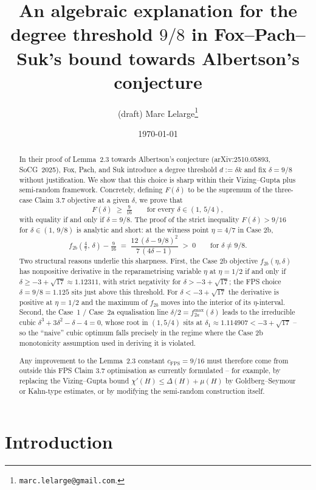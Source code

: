 \documentclass[11pt,a4paper]{article}
\title{An algebraic explanation for the degree threshold
       $9/8$ in Fox--Pach--Suk's bound towards Albertson's conjecture}
\author{(draft) Marc Lelarge\thanks{\texttt{marc.lelarge@gmail.com}.}}
\date{\today}
\theoremstyle{definition}
\newcommand{\cFPS}{c_{\mathrm{FPS}}}
\newcommand{\chip}{\chi'}
\begin{document}
\maketitle

\begin{abstract}
In their proof of Lemma~2.3 towards Albertson's conjecture
(arXiv:2510.05893, SoCG~2025), Fox, Pach, and Suk introduce a
degree threshold $d := \delta k$ and fix $\delta = 9/8$ without
justification. We show that this choice is sharp within their
Vizing--Gupta plus semi-random framework. Concretely, defining
$F(\delta)$ to be the supremum of the three-case Claim 3.7
objective at a given $\delta$, we prove that
\[
   F(\delta) \;\ge\; \tfrac{9}{16}
   \qquad\text{for every }\delta\in(1,\,5/4),
\]
with equality if and only if $\delta = 9/8$. The proof of the
strict inequality $F(\delta) > 9/16$ for $\delta \in (1,\,9/8)$ is
analytic and short: at the witness point $\eta = 4/7$ in Case 2b,
\[
   f_{2b}\!\left(\tfrac{4}{7},\,\delta\right) - \tfrac{9}{16}
   \;=\; \frac{12\,(\delta - 9/8)^2}{7\,(4\delta - 1)} \;>\; 0
   \qquad \text{for } \delta \neq 9/8.
\]
Two structural reasons underlie this sharpness. First, the
Case 2b objective $f_{2b}(\eta, \delta)$ has nonpositive derivative
in the reparametrising variable $\eta$ at $\eta = 1/2$ if and only
if $\delta \ge -3 + \sqrt{17} \approx 1.12311$, with strict
negativity for $\delta > -3 + \sqrt{17}$; the FPS choice
$\delta = 9/8 = 1.125$ sits just above this threshold. For
$\delta < -3 + \sqrt{17}$ the derivative is positive at $\eta = 1/2$
and the maximum of $f_{2b}$ moves into the interior of its
$\eta$-interval.
Second, the Case~1 / Case~2a equalisation line $\delta/2 =
f_{2a}^{\max}(\delta)$ leads to the irreducible cubic
$\delta^3 + 3\delta^2 - \delta - 4 = 0$, whose root in $(1, 5/4)$
sits at $\delta_1 \approx 1.114907 < -3 + \sqrt{17}$ -- so the
``naive'' cubic optimum falls precisely in the regime where the
Case 2b monotonicity assumption used in deriving it is violated.

Any improvement to the Lemma~2.3 constant $\cFPS = 9/16$ must
therefore come from outside this FPS Claim 3.7 optimisation as
currently formulated -- for example, by replacing the Vizing--Gupta
bound $\chip(H) \le \Delta(H) + \mu(H)$ by Goldberg--Seymour or
Kahn-type estimates, or by modifying the semi-random construction
itself.
\end{abstract}

\section{Introduction}
\end{document}
